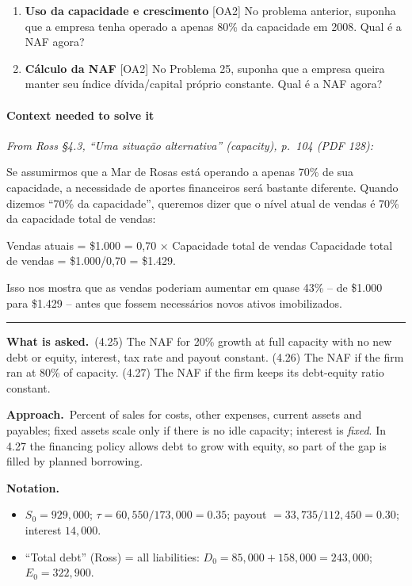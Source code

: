 \documentclass[11pt,a4paper]{article}
\newcommand{\notation}{\par\noindent\textbf{Notation.}}
\newcommand{\asked}{\par\medskip\noindent\textbf{What is asked.}~}
\newcommand{\approach}{\par\smallskip\noindent\textbf{Approach.}~}
\newcommand{\stmtend}{\par\endgroup\nopagebreak\noindent\rule{\linewidth}{0.4pt}\par\medskip}
\begin{document}
\begin{enumerate}
\def\labelenumi{\arabic{enumi}.}
\setcounter{enumi}{25}
\item
  \textbf{Uso da capacidade e crescimento} {[}OA2{]} No problema anterior, suponha que a empresa
  tenha operado a apenas 80\% da capacidade em 2008. Qual é a NAF agora?
\item
  \textbf{Cálculo da NAF} {[}OA2{]} No Problema 25, suponha que a empresa queira manter seu índice
  dívida/capital próprio constante. Qual é a NAF agora?
\end{enumerate}

\paragraph{Context needed to solve it}

\emph{From Ross §4.3, ``Uma situação alternativa'' (capacity), p.~104 (PDF 128):}

Se assumirmos que a Mar de Rosas está operando a apenas 70\% de sua capacidade, a necessidade de
aportes financeiros será bastante diferente. Quando dizemos ``70\% da capacidade'', queremos dizer
que o nível atual de vendas é 70\% da capacidade total de vendas:

Vendas atuais = \$1.000 = 0,70 × Capacidade total de vendas Capacidade total de vendas =
\$1.000/0,70 = \$1.429.

Isso nos mostra que as vendas poderiam aumentar em quase 43\% -- de \$1.000 para \$1.429 -- antes
que fossem necessários novos ativos imobilizados.
\stmtend

\asked (4.25) The NAF for 20\% growth at full capacity with no new debt or equity, interest, tax rate
and payout constant. (4.26) The NAF if the firm ran at 80\% of capacity. (4.27) The NAF if the firm
keeps its debt-equity ratio constant.

\approach Percent of sales for costs, other expenses, current assets and payables; fixed assets scale
only if there is no idle capacity; interest is \emph{fixed}. In 4.27 the financing policy allows debt
to grow with equity, so part of the gap is filled by planned borrowing.

\notation
\begin{itemize}
  \item $S_0=929{,}000$; $\tau=60{,}550/173{,}000=0.35$; payout $=33{,}735/112{,}450=0.30$; interest $14{,}000$.
  \item ``Total debt'' (Ross) = all liabilities: $D_0=85{,}000+158{,}000=243{,}000$; $E_0=322{,}900$.
\end{itemize}
\end{document}
